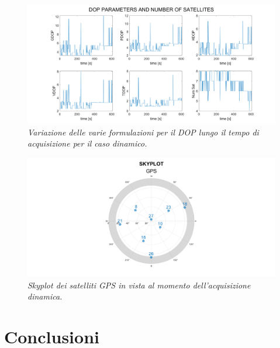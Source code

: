 \documentclass[a4paper,11pt,twoside]{book}
\begin{document}
	\vspace{-0.5cm}
	
	\begin{figure}[H]
		\centering
		\includegraphics[scale=0.25]{"Immagini workbook/Immagini esp8/din83"}
		\caption{\textit{Variazione delle varie formulazioni per il DOP lungo il tempo di acquisizione per il caso dinamico.}}
		\label{fig:din83}
	\end{figure}
	
	\vspace{-0.5cm}
	
	
	\begin{figure}[H]
		\centering
		\includegraphics[scale=0.25]{"Immagini workbook/Immagini esp8/din5"}
		\caption{\textit{Skyplot dei satelliti GPS in vista al momento dell'acquisizione dinamica.}}
		\label{fig:din85}
	\end{figure}
	
	\section{Conclusioni}
	
\end{document}
